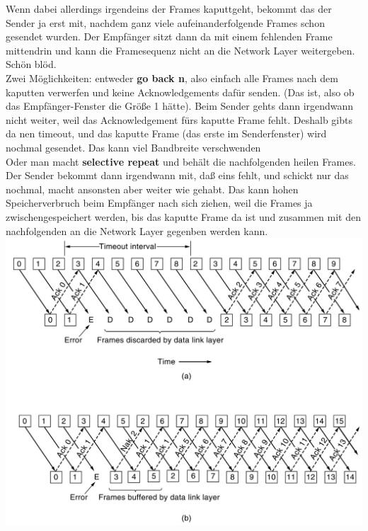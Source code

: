 \documentclass[10pt,a4paper]{scrartcl}
\begin{document}
Wenn dabei allerdings irgendeins der Frames kaputtgeht, bekommt das der Sender ja erst mit, nachdem ganz viele aufeinanderfolgende Frames schon gesendet wurden. Der Empfänger sitzt dann da mit einem fehlenden Frame mittendrin und kann die Framesequenz nicht an die Network Layer weitergeben. Schön blöd.\\
Zwei Möglichkeiten: entweder \textbf{go back n}, also einfach alle Frames nach dem kaputten verwerfen und keine Acknowledgements dafür senden. (Das ist, also ob das Empfänger-Fenster die Größe 1 hätte). Beim Sender gehts dann irgendwann nicht weiter, weil das Acknowledgement fürs kaputte Frame fehlt. Deshalb gibts da nen timeout, und das kaputte Frame (das erste im Senderfenster) wird nochmal gesendet. Das kann viel Bandbreite verschwenden\\
Oder man macht \textbf{selective repeat} und behält die nachfolgenden heilen Frames. Der Sender bekommt dann irgendwann mit, daß eins fehlt, und schickt nur das nochmal, macht ansonsten aber weiter wie gehabt. Das kann hohen Speicherverbruch beim Empfänger nach sich ziehen, weil die Frames ja zwischengespeichert werden, bis das kaputte Frame da ist und zusammen mit den nachfolgenden an die Network Layer gegenben werden kann.\\
\includegraphics[width=\textwidth]{a4e4.jpg}\\
\end{document}
